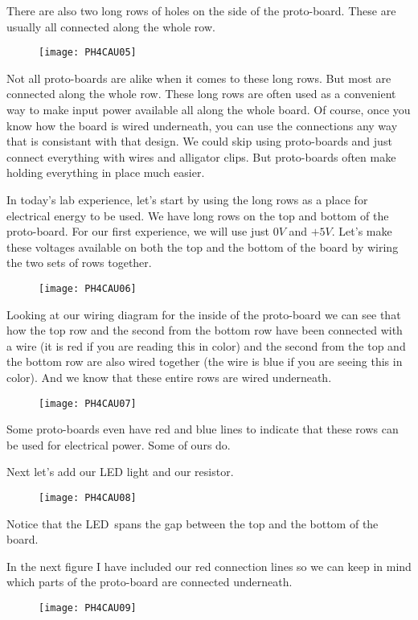 There are also two long rows of holes on the side of the proto-board. These
are usually all connected along the whole row. \begin{figure}[h!]
\texttt{[image: PH4CAU05]}
\end{figure}Not all proto-boards are alike
when it comes to these long rows. But most are connected along the whole
row. These long rows are often used as a convenient way to make input power
available all along the whole board. Of course, once you know how the board
is wired underneath, you can use the connections any way that is consistant
with that design. We could skip using proto-boards and just connect
everything with wires and alligator clips. But proto-boards often make
holding everything in place much easier.

In today's lab experience, let's start by using the long rows as a place for
electrical energy to be used. We have long rows on the top and bottom of the
proto-board. For our first experience, we will use just $0\unit{V}$ and $+5%
\unit{V}.$ Let's make these voltages available on both the top and the
bottom of the board by wiring the two sets of rows together. \begin{figure}[h!]
\texttt{[image: PH4CAU06]}
\end{figure}%
Looking at our wiring diagram for the inside of the proto-board we can see
that how the top row and the second from the bottom row have been connected
with a wire (it is red if you are reading this in color) and the second from
the top and the bottom row are also wired together (the wire is blue if you
are seeing this in color). And we know that these entire rows are wired
underneath. \begin{figure}[h!]
\texttt{[image: PH4CAU07]}
\end{figure}Some proto-boards even have red
and blue lines to indicate that these rows can be used for electrical power.
Some of ours do.

Next let's add our LED light and our resistor. \begin{figure}[h!]
\texttt{[image: PH4CAU08]}
\end{figure}Notice that the LED\ spans the
gap between the top and the bottom of the board.

In the next figure I have included our red connection lines so we can keep
in mind which parts of the proto-board are connected underneath.\begin{figure}[h!]
\texttt{[image: PH4CAU09]}
\end{figure}

